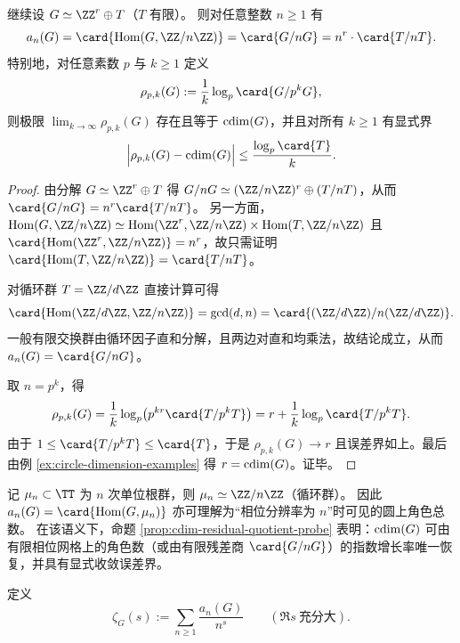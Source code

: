 \begin{proposition}\label{prop:cdim-residual-quotient-probe}
继续设 \(G\simeq \ZZ^r\oplus T\)（\(T\) 有限）。
则对任意整数 \(n\ge 1\) 有
\[
a_n(G)=\card{\operatorname{Hom}(G,\ZZ/n\ZZ)}=\card{G/nG}
=n^r\cdot \card{T/nT}.
\]
特别地，对任意素数 \(p\) 与 \(k\ge 1\) 定义
\[
\rho_{p,k}(G):=\frac{1}{k}\log_p\card{G/p^kG},
\]
则极限 \(\lim_{k\to\infty}\rho_{p,k}(G)\) 存在且等于 \(\operatorname{cdim}(G)\)，并且对所有 \(k\ge 1\) 有显式界
\[
\Bigl|\rho_{p,k}(G)-\cdim(G)\Bigr|\le \frac{\log_p\card{T}}{k}.
\]
\end{proposition}
\begin{proof}
由分解 \(G\simeq \ZZ^r\oplus T\) 得
\(
G/nG\simeq (\ZZ/n\ZZ)^r\oplus (T/nT)
\)，从而 \(\card{G/nG}=n^r\card{T/nT}\)。
另一方面，
\(
\operatorname{Hom}(G,\ZZ/n\ZZ)\simeq \operatorname{Hom}(\ZZ^r,\ZZ/n\ZZ)\times \operatorname{Hom}(T,\ZZ/n\ZZ)
\)
且 \(\card{\operatorname{Hom}(\ZZ^r,\ZZ/n\ZZ)}=n^r\)，故只需证明
\(\card{\operatorname{Hom}(T,\ZZ/n\ZZ)}=\card{T/nT}\)。
\par
对循环群 \(T=\ZZ/d\ZZ\) 直接计算可得
\[
\card{\operatorname{Hom}(\ZZ/d\ZZ,\ZZ/n\ZZ)}=\gcd(d,n)
=\card{(\ZZ/d\ZZ)/n(\ZZ/d\ZZ)}.
\]
一般有限交换群由循环因子直和分解，且两边对直和均乘法，故结论成立，从而 \(a_n(G)=\card{G/nG}\)。
\par
取 \(n=p^k\)，得
\[
\rho_{p,k}(G)=\frac{1}{k}\log_p\bigl(p^{kr}\card{T/p^kT}\bigr)
=r+\frac{1}{k}\log_p\card{T/p^kT}.
\]
由于 \(1\le \card{T/p^kT}\le \card{T}\)，于是
\(
\rho_{p,k}(G)\to r
\)
且误差界如上。最后由例 \ref{ex:circle-dimension-examples} 得 \(r=\operatorname{cdim}(G)\)。证毕。
\end{proof}

\begin{remark}[有限相位分辨率的角色数解释]\label{rem:cdim-mu-n-character-count}
记 \(\mu_n\subset \TT\) 为 \(n\) 次单位根群，则 \(\mu_n\simeq \ZZ/n\ZZ\)（循环群）。
因此 \(a_n(G)=\card{\operatorname{Hom}(G,\mu_n)}\) 亦可理解为“相位分辨率为 \(n\)”时可见的圆上角色总数。
在该语义下，命题 \ref{prop:cdim-residual-quotient-probe} 表明：\(\operatorname{cdim}(G)\) 可由有限相位网格上的角色数（或由有限残差商 \(\card{G/nG}\)）的指数增长率唯一恢复，并具有显式收敛误差界。
\end{remark}

\begin{definition}\label{def:cdim-zeta-function}
定义
\[
\zeta_G(s):=\sum_{n\ge 1}\frac{a_n(G)}{n^s}\qquad(\Re s\ \text{充分大}).
\]
\end{definition}

